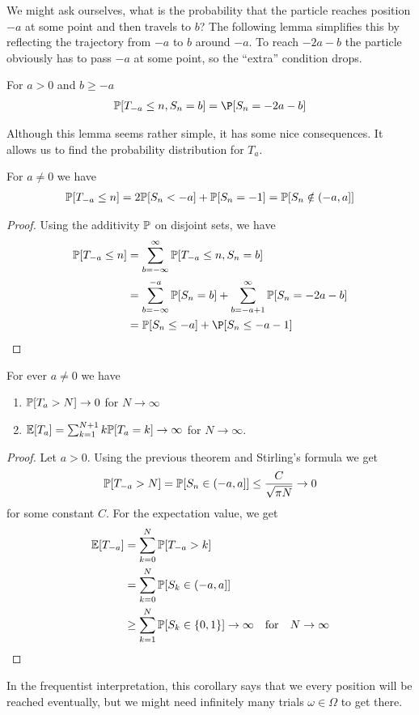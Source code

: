 We might ask ourselves, what is the probability that the particle reaches position $-a$ at some point and then travels to $b$? 
The following lemma simplifies this by reflecting the trajectory from $-a$ to $b$ around $-a$.
To reach $-2a -b$ the particle obviously has to pass $-a$ at some point, so the ``extra'' condition drops.
\begin{lem}
For $a > 0$ and $b \geq -a$
\begin{align*}
  \IP[T_{-a} \leq n, S_n = b] = \P[S_n = -2a - b]
\end{align*}
\end{lem}

Although this lemma seems rather simple, it has some nice consequences. It allows us to find the probability distribution for $T_a$.
\begin{thm}[]
For $a \neq 0$ we have
\begin{align*}
  \mathbb{P}[T_{-a} \leq n] = 2 \mathbb{P}[S_n <-a] + \mathbb{P}[S_n = -1] = \mathbb{P}[S_n \notin (-a,a]]
\end{align*}
\end{thm}
\begin{proof}
Using the additivity $\mathbb{P}$ on disjoint sets, we have
\begin{align*}
  \IP[T_{-a} \leq n] 
  &= 
  \sum_{b=-\infty}^{\infty}\IP[T_{-a} \leq n, S_n = b]\\
  &=
  \sum_{b=-\infty}^{-a}\IP[S_n = b] + \sum_{b=-a+1}^{\infty}\IP[S_n = -2a - b]\\
  &= \IP[S_n \leq -a] + \P[S_n \leq -a -1]
\end{align*}
\end{proof}
\begin{cor}
For ever $a \neq 0$ we have
\begin{enumerate}
  \item $\mathbb{P}[T_a > N] \to 0$ for $N \to \infty$
  \item $\mathbb{E}[T_a] = \sum_{k=1}^{N+1}k \mathbb{P}[T_a = k] \to \infty$ for $N \to  \infty$.
\end{enumerate}
\end{cor}
\begin{proof}
Let $a > 0$. Using the previous theorem and Stirling's formula we get
\begin{align*}
  \mathbb{P}[T_{-a} > N] = \mathbb{P}[S_{n} \in (-a,a]] \leq \frac{C}{\sqrt{\pi N}} \to  0
\end{align*}
for some constant $C$. For the expectation value, we get
\begin{align*}
  \mathbb{E}[T_{-a}]
  &=
  \sum_{k=0}^{N}\mathbb{P}[T_{-a} > k]\\
  &=
  \sum_{k=0}^{N}\mathbb{P}[S_k \in (-a,a]]\\
  &\geq \sum_{k=1}^{N}\mathbb{P}[S_k \in \{0,1\}] \to  \infty \quad \text{for} \quad N \to  \infty
\end{align*}
\end{proof}
In the frequentist interpretation, this corollary says that we every position will be reached eventually, but we might need infinitely many trials $\omega \in \Omega$ to get there.


